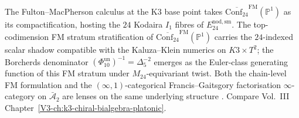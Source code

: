 \begin{remark}
\label{rem:fmc-1}
The Fulton--MacPherson calculus at the K3 base point takes
$\overline{\mathrm{Conf}_{24}}^{\mathrm{FM}}(\mathbb P^1)$ as its
compactification, hosting the $24$ Kodaira $I_1$ fibres of
$E^{\mathrm{nod,sm}}_{24}$. The top-codimension FM stratum stratification
of $\overline{\mathrm{Conf}_{24}}^{\mathrm{FM}}(\mathbb P^1)$ carries
the $24$-indexed scalar shadow compatible with the Kaluza--Klein
numerics on $K3\times T^2$; the Borcherds
denominator $(\Phi_{10}^{\mathrm{un}})^{-1} = \Delta_5^{-2}$ emerges as the Euler-class
generating function of this FM stratum under $M_{24}$-equivariant
twist. Both the chain-level FM formulation and the
$(\infty,1)$-categorical Francis--Gaitsgory factorisation
$\infty$-category on $\bar{\mathcal A}_2$ are lenses on the same
underlying structure \cite{FultonMacPherson1994,FrancisGaitsgoryFactorization,Borcherds1992}.
Compare Vol.~III Chapter~\ref{V3-ch:k3-chiral-bialgebra-platonic}.
\end{remark}
